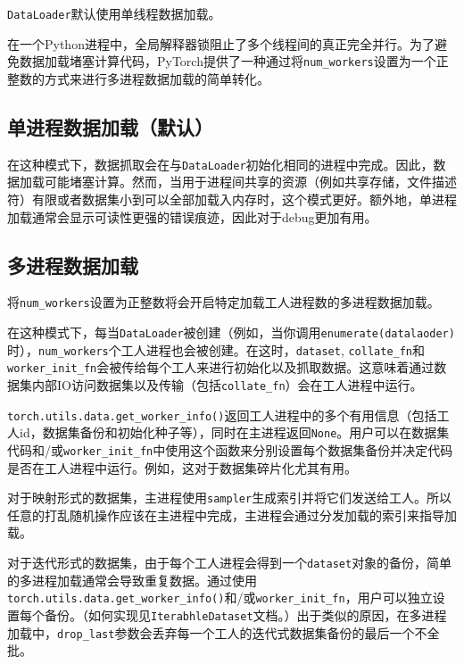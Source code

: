 \documentclass[../main.tex]{subfile}
\begin{document}
\lstinline{DataLoader}默认使用单线程数据加载。

在一个Python进程中，全局解释器锁阻止了多个线程间的真正完全并行。为了避免数据加载堵塞计算代码，PyTorch提供了一种通过将\lstinline{num_workers}设置为一个正整数的方式来进行多进程数据加载的简单转化。

\subsection{单进程数据加载（默认）}

在这种模式下，数据抓取会在与\lstinline{DataLoader}初始化相同的进程中完成。因此，数据加载可能堵塞计算。然而，当用于进程间共享的资源（例如共享存储，文件描述符）有限或者数据集小到可以全部加载入内存时，这个模式更好。额外地，单进程加载通常会显示可读性更强的错误痕迹，因此对于debug更加有用。

\subsection{多进程数据加载}

将\lstinline{num_workers}设置为正整数将会开启特定加载工人进程数的多进程数据加载。

在这种模式下，每当\lstinline{DataLoader}被创建（例如，当你调用\lstinline{enumerate(datalaoder)}时），\lstinline{num_workers}个工人进程也会被创建。在这时，\lstinline{dataset}, \lstinline{collate_fn}和\lstinline{worker_init_fn}会被传给每个工人来进行初始化以及抓取数据。这意味着通过数据集内部IO访问数据集以及传输（包括\lstinline{collate_fn}）会在工人进程中运行。

\lstinline{torch.utils.data.get_worker_info()}返回工人进程中的多个有用信息（包括工人id，数据集备份和初始化种子等），同时在主进程返回\lstinline{None}。用户可以在数据集代码和/或\lstinline{worker_init_fn}中使用这个函数来分别设置每个数据集备份并决定代码是否在工人进程中运行。例如，这对于数据集碎片化尤其有用。

对于映射形式的数据集，主进程使用\lstinline{sampler}生成索引并将它们发送给工人。所以任意的打乱随机操作应该在主进程中完成，主进程会通过分发加载的索引来指导加载。

对于迭代形式的数据集，由于每个工人进程会得到一个\lstinline{dataset}对象的备份，简单的多进程加载通常会导致重复数据。通过使用\lstinline{torch.utils.data.get_worker_info()}和/或\lstinline{worker_init_fn}，用户可以独立设置每个备份。（如何实现见\lstinline{IterabhleDataset}文档。）出于类似的原因，在多进程加载中，\lstinline{drop_last}参数会丢弃每一个工人的迭代式数据集备份的最后一个不全批。
\end{document}
